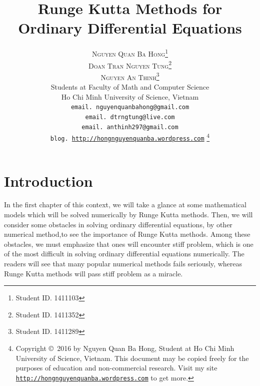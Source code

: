 \documentclass[a4paper,oneside]{book}
\title{\Huge Runge Kutta Methods for Ordinary Differential Equations}
\author{\textsc{Nguyen Quan Ba Hong}\footnote{Student ID. 1411103}\\
\textsc{Doan Tran Nguyen Tung}\footnote{Student ID. 1411352}\\
\textsc{Nguyen An Thinh}\footnote{Student ID. 1411289}\\
{\small Students at Faculty of Math and Computer Science}\\ 
{\small Ho Chi Minh University of Science, Vietnam} \\
{\small \texttt{email. nguyenquanbahong@gmail.com}}\\
{\small \texttt{email. dtrngtung@live.com}}\\
{\small \texttt{email. anthinh297@gmail.com}}\\
{\small \texttt{blog. \url{http://hongnguyenquanba.wordpress.com}} 
\footnote{Copyright \copyright\ 2016 by Nguyen Quan Ba Hong, Student at Ho Chi Minh University of Science, Vietnam. This document may be copied freely for the purposes of education and non-commercial research. Visit my site \texttt{\url{http://hongnguyenquanba.wordpress.com}} to get more.}}}
\numberwithin{equation}{chapter}
\begin{document}
\maketitle
\addtocounter{page}{1}
\thispagestyle{plain}
\begin{sloppypar}
\par{}
\end{sloppypar}
\tableofcontents
\listoffigures
\listoftables
\chapter{Introduction}
In the first chapter of this context, we will take a glance at some mathematical models which will be solved numerically by Runge Kutta methods. Then, we will consider some obstacles in solving ordinary differential equations, by other numerical method,to see the importance of Runge Kutta methods. Among these obstacles, we must emphasize that ones will encounter stiff problem, which is one of the most difficult in solving ordinary differential equations numerically. The readers will see that many popular numerical methods fails seriously, whereas Runge Kutta methods will pass stiff problem as a miracle.
\end{document}
